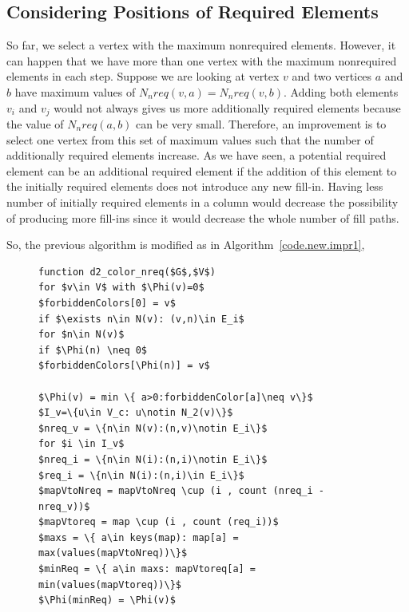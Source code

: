 \documentclass[12pt, twoside]{book}
\newcommand{\coderef}[1]{Algorithm~\protect\ref{#1}}
\newcommand{\todo}[1]{\textbf{#1}}
\begin{document}
\subsection{Considering Positions of Required Elements}
So far, we select a vertex with the maximum nonrequired elements. However, it can happen
that we have more than one vertex with the maximum nonrequired elements in each step.
Suppose we are looking at vertex $v$ and two vertices $a$ and $b$ have maximum values of
$N_nreq(v,a) = N_nreq(v,b)$.
Adding both elements $v_i$ and $v_j$ would not always gives us more additionally required elements
because the value of $N_nreq(a,b)$ can be very small.
Therefore, an improvement is to select one vertex from this set of maximum values such that the number of
additionally required elements increase. As we have seen, a potential required element can be
an additional required element if the addition of this element to the initially required elements
does not introduce any new fill-in. Having less number of initially required elements in a column would decrease
the possibility of producing more fill-ins since it would decrease the whole number of fill paths. \todo{}

So, the previous algorithm is modified as in \coderef{code.new.impr1},
\begin{figure}
\begin{lstlisting}[caption=New coloring heuristc increasing the number of additionally required elements.,label=code.new.impr1,mathescape]
function d2_color_nreq($G$,$V$)
for $v\in V$ with $\Phi(v)=0$
$forbiddenColors[0] = v$
if $\exists n\in N(v): (v,n)\in E_i$
for $n\in N(v)$
if $\Phi(n) \neq 0$
$forbiddenColors[\Phi(n)] = v$

$\Phi(v) = min \{ a>0:forbiddenColor[a]\neq v\}$
$I_v=\{u\in V_c: u\notin N_2(v)\}$
$nreq_v = \{n\in N(v):(n,v)\notin E_i\}$
for $i \in I_v$
$nreq_i = \{n\in N(i):(n,i)\notin E_i\}$
$req_i = \{n\in N(i):(n,i)\in E_i\}$
$mapVtoNreq = mapVtoNreq \cup (i , count (nreq_i - nreq_v))$
$mapVtoreq = map \cup (i , count (req_i))$
$maxs = \{ a\in keys(map): map[a] = max(values(mapVtoNreq))\}$
$minReq = \{ a\in maxs: mapVtoreq[a] = min(values(mapVtoreq))\}$
$\Phi(minReq) = \Phi(v)$
\end{lstlisting}
\end{figure}
\end{document}
